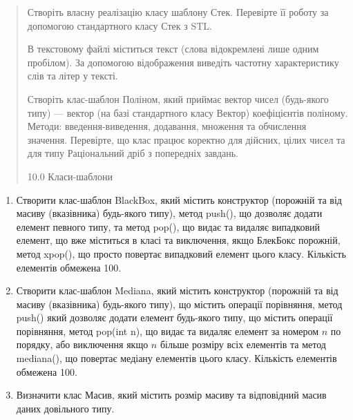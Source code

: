 \documentclass[]{article}
\begin{document}
\begin{quote}
Створіть власну реалізацію класу шаблону Стек. Перевірте її роботу за
допомогою стандартного класу Стек з STL.

В текстовому файлі міститься текст (слова відокремлені лише одним
пробілом). За допомогою відображення виведіть частотну характеристику
слів та літер у тексті.

Створіть клас-шаблон Поліном, який приймає вектор чисел (будь-якого
типу) --- вектор (на базі стандартного класу Вектор) коефіцієнтів
поліному. Методи: введення-виведення, додавання, множення та обчислення
значення. Перевірте, що клас працює коректно для дійсних, цілих чисел та
для типу Раціональний дріб з попередніх завдань.

10.0 Класи-шаблони
\end{quote}

\begin{enumerate}
\def\labelenumi{\arabic{enumi}.}
\item
  \protect\hypertarget{_Hlk65951836}{}{}Створити клас-шаблон BlackBox,
  який містить конструктор (порожній та від масиву (вказівника)
  будь-якого типу), метод push(), що дозволяє додати елемент певного
  типу, та метод pop(), що видає та видаляє випадковий елемент, що вже
  міститься в класі та виключення, якщо БлекБокс порожній, метод xpop(),
  що просто повертає випадковий елемент цього класу. Кількість елементів
  обмежена 100.
\item
  Створити клас-шаблон Mediana, який містить конструктор (порожній та
  від масиву (вказівника) будь-якого типу), що містить операції
  порівняння, метод push() який дозволяє додати елемент будь-якого типу,
  що містить операції порівняння, метод pop(int n), що видає та видаляє
  елемент за номером \(n\) по порядку, або виключення якщо \(n\) більше
  розміру всіх елементів та метод mediana(), що повертає медіану
  елементів цього класу. Кількість елементів обмежена 100.
\item
  Визначити клас Масив, який містить розмір масиву та відповідний масив
  даних довільного типу.
\end{enumerate}
\end{document}
